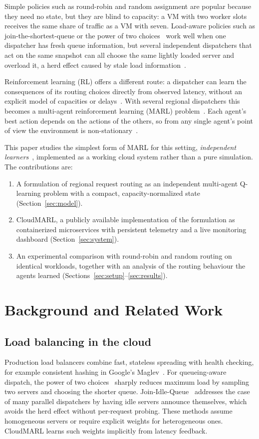 \documentclass[conference]{IEEEtran}
\begin{document}
Simple policies such as round-robin and random assignment are popular because they need no state, but they are blind to capacity: a VM with two worker slots receives the same share of traffic as a VM with seven. Load-aware policies such as join-the-shortest-queue or the power of two choices~\cite{mitzenmacher2001} work well when one dispatcher has fresh queue information, but several independent dispatchers that act on the same snapshot can all choose the same lightly loaded server and overload it, a herd effect caused by stale load information~\cite{mitzenmacher2000old}.

Reinforcement learning (RL) offers a different route: a dispatcher can learn the consequences of its routing choices directly from observed latency, without an explicit model of capacities or delays~\cite{sutton2018,mao2016deeprm}. With several regional dispatchers this becomes a multi-agent reinforcement learning (MARL) problem~\cite{busoniu2008}. Each agent's best action depends on the actions of the others, so from any single agent's point of view the environment is non-stationary~\cite{hernandezleal2017}.

This paper studies the simplest form of MARL for this setting, \emph{independent learners}~\cite{tan1993,claus1998}, implemented as a working cloud system rather than a pure simulation. The contributions are:
\begin{enumerate}
\item A formulation of regional request routing as an independent multi-agent Q-learning problem with a compact, capacity-normalized state (Section~\ref{sec:model}).
\item CloudMARL, a publicly available implementation of the formulation as containerized microservices with persistent telemetry and a live monitoring dashboard (Section~\ref{sec:system}).
\item An experimental comparison with round-robin and random routing on identical workloads, together with an analysis of the routing behaviour the agents learned (Sections~\ref{sec:setup}--\ref{sec:results}).
\end{enumerate}

\section{Background and Related Work}
\subsection{Load balancing in the cloud}
Production load balancers combine fast, stateless spreading with health checking, for example consistent hashing in Google's Maglev~\cite{eisenbud2016maglev}. For queueing-aware dispatch, the power of two choices~\cite{mitzenmacher2001} sharply reduces maximum load by sampling two servers and choosing the shorter queue. Join-Idle-Queue~\cite{lu2011jiq} addresses the case of many parallel dispatchers by having idle servers announce themselves, which avoids the herd effect without per-request probing. These methods assume homogeneous servers or require explicit weights for heterogeneous ones. CloudMARL learns such weights implicitly from latency feedback.
\end{document}
